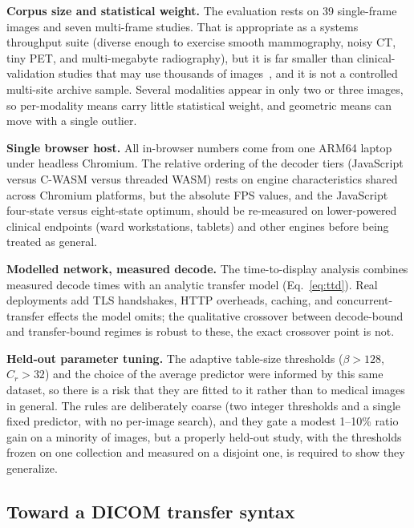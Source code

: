 \documentclass[journal]{IEEEtran}
\begin{document}
\textbf{Corpus size and statistical weight.} The evaluation rests on 39
single-frame images and seven multi-frame studies. That is appropriate as a
systems throughput suite (diverse enough to exercise smooth mammography,
noisy CT, tiny PET, and multi-megabyte radiography), but it is far smaller
than clinical-validation studies that may use thousands of
images~\cite{clunie2000}, and it is not a controlled multi-site archive
sample. Several modalities appear in only two or three images, so
per-modality means carry little statistical weight, and geometric means can
move with a single outlier.

\textbf{Single browser host.} All in-browser numbers come from one ARM64
laptop under headless Chromium. The relative ordering of the decoder tiers
(JavaScript versus C-WASM versus threaded WASM) rests on engine
characteristics shared across Chromium platforms, but the absolute FPS
values, and the JavaScript four-state versus eight-state optimum, should be
re-measured on lower-powered clinical endpoints (ward workstations,
tablets) and other engines before being treated as general.

\textbf{Modelled network, measured decode.} The time-to-display analysis
combines measured decode times with an analytic transfer model
(Eq.~\eqref{eq:ttd}). Real deployments add TLS handshakes, HTTP overheads,
caching, and concurrent-transfer effects the model omits; the qualitative
crossover between decode-bound and transfer-bound regimes is robust to
these, the exact crossover point is not.

\textbf{Held-out parameter tuning.} The adaptive table-size thresholds
($\beta > 128$, $C_r > 32$) and the choice of the average predictor were
informed by this same dataset, so there is a risk that they are fitted to it
rather than to medical images in general. The rules are deliberately coarse
(two integer thresholds and a single fixed predictor, with no per-image
search), and they gate a modest 1--10\% ratio gain on a minority of images,
but a properly held-out study, with the thresholds frozen on one collection
and measured on a disjoint one, is required to show they generalize.

\subsection{Toward a DICOM transfer syntax}
\end{document}
